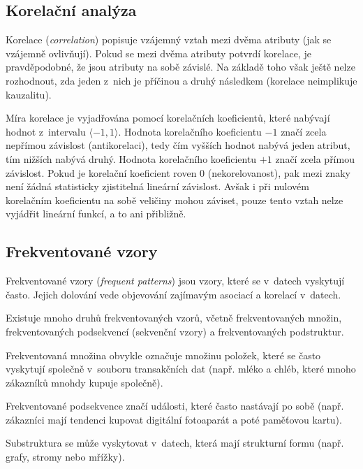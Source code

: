 \subsection{Korelační analýza}

\begin{compactitem}
    \item Korelace (\textit{correlation}) popisuje vzájemný vztah mezi dvěma atributy (jak se vzájemně ovlivňují). Pokud se mezi dvěma atributy potvrdí korelace, je pravděpodobné, že jsou atributy na sobě závislé. Na základě toho však ještě nelze rozhodnout, zda jeden z~nich je příčinou a druhý následkem (korelace neimplikuje kauzalitu).

    \item Míra korelace je vyjadřována pomocí korelačních koeficientů, které nabývají hodnot z~intervalu $\langle-1,1\rangle$. Hodnota korelačního koeficientu $-1$ značí zcela nepřímou závislost (antikorelaci), tedy čím vyšších hodnot nabývá jeden atribut, tím nižších nabývá druhý. Hodnota korelačního koeficientu $+1$ značí zcela přímou závislost. Pokud je korelační koeficient roven 0 (nekorelovanost), pak mezi znaky není žádná statisticky zjistitelná lineární závislost. Avšak i při nulovém korelačním koeficientu na sobě veličiny mohou záviset, pouze tento vztah nelze vyjádřit lineární funkcí, a to ani přibližně.
\end{compactitem}

\subsection{Frekventované vzory}

\begin{compactitem}
    \item Frekventované vzory (\textit{frequent patterns}) jsou vzory, které se v~datech vyskytují často. Jejich dolování vede objevování zajímavým asociací a korelací v~datech.

    \item Existuje mnoho druhů frekventovaných vzorů, včetně frekventovaných množin, frekventovaných podsekvencí (sekvenční vzory) a frekventovaných podstruktur.

    \item Frekventovaná množina obvykle označuje množinu položek, které se často vyskytují společně v~souboru transakčních dat (např. mléko a chléb, které mnoho zákazníků mnohdy kupuje společně).

    \item Frekventované podsekvence značí události, které často nastávají po sobě (např. zákazníci mají tendenci kupovat digitální fotoaparát a poté paměťovou kartu).

    \item Substruktura se může vyskytovat v~datech, která mají strukturní formu (např. grafy, stromy nebo mřížky).
\end{compactitem}

